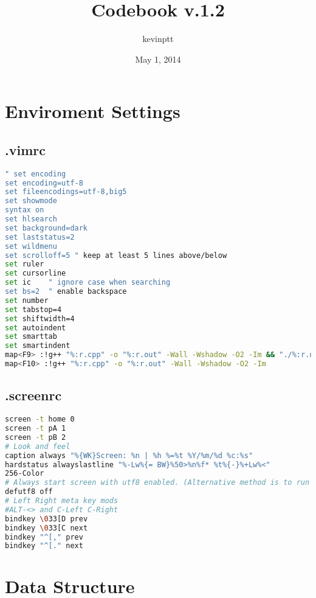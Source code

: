 \documentclass[11pt,twocolumn,a4paper]{article}
\title{Codebook v.1.2}
\author{kevinptt}
\date{May 1, 2014}
\begin{document}
\renewcommand{\contentsname}{Index}
\tableofcontents

\newpage
\section{Enviroment Settings}
\subsection{.vimrc}
\begin{lstlisting}[label=.vimrc,language=bash]
" set encoding
set encoding=utf-8
set fileencodings=utf-8,big5
set showmode
syntax on
set hlsearch
set background=dark
set laststatus=2
set wildmenu
set scrolloff=5 " keep at least 5 lines above/below
set ruler
set cursorline
set ic    " ignore case when searching
set bs=2  " enable backspace
set number
set tabstop=4
set shiftwidth=4
set autoindent
set smarttab
set smartindent
map<F9> :!g++ "%:r.cpp" -o "%:r.out" -Wall -Wshadow -O2 -Im && "./%:r.out"
map<F10> :!g++ "%:r.cpp" -o "%:r.out" -Wall -Wshadow -O2 -Im
\end{lstlisting}

\subsection{.screenrc}
\begin{lstlisting}[label=.screenrc,language=bash]
screen -t home 0
screen -t pA 1
screen -t pB 2
# Look and feel
caption always "%{WK}Screen: %n | %h %=%t %Y/%m/%d %c:%s"
hardstatus alwayslastline "%-Lw%{= BW}%50>%n%f* %t%{-}%+Lw%<"
256-Color
# Always start screen with utf8 enabled. (Alternative method is to run screen with -U parameter)
defutf8 off
# Left Right meta key mods
#ALT-<> and C-Left C-Right
bindkey \033[D prev
bindkey \033[C next
bindkey "^[," prev
bindkey "^[." next
\end{lstlisting}

\newpage
\section{Data Structure}
\end{document}
